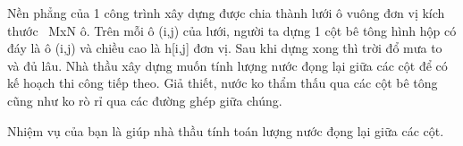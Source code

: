 Nền phẳng của 1 công trình xây dựng được chia thành lưới ô vuông đơn vị kích thước  MxN ô. Trên mỗi ô (i,j) của lưới, người ta dựng 1 cột bê tông hình hộp có đáy là ô (i,j) và chiều cao là h[i,j] đơn vị. Sau khi dựng xong thì trời đổ mưa to và đủ lâu. Nhà thầu xây dựng muốn tính lượng nước đọng lại giữa các cột để có kế hoạch thi công tiếp theo. Giả thiết, nước ko thẩm thấu qua các cột bê tông cũng như ko rò rỉ qua các đường ghép giữa chúng.  

   Nhiệm vụ của bạn là giúp nhà thầu tính toán lượng nước đọng lại giữa các cột.